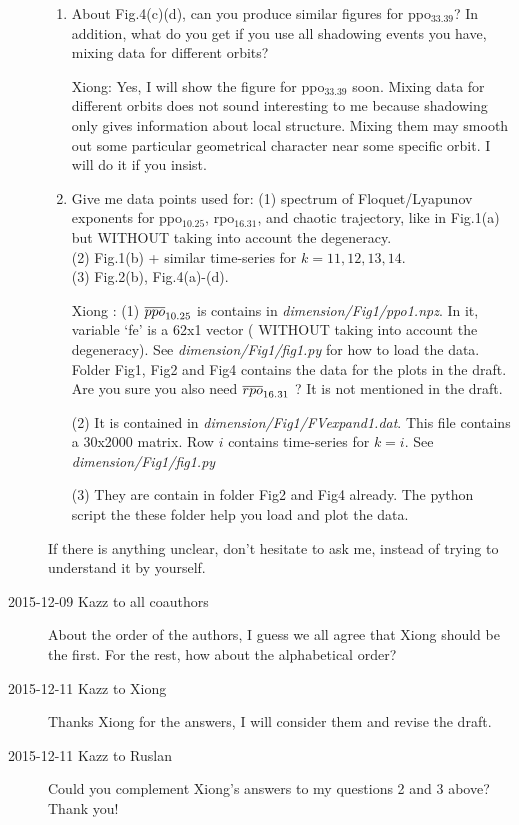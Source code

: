 \begin{description}
\begin{enumerate}
\item
About Fig.4(c)(d), can you produce similar figures for ppo$_{33.39}$? In addition, what do you get if you use all shadowing events you have, mixing data for different orbits?

Xiong: Yes, I will show the figure for ppo$_{33.39}$ soon.
Mixing data for different orbits does not sound interesting to me because shadowing only gives
information about local structure. Mixing them may smooth out some particular geometrical
character near some specific orbit. I will do it if you insist.

\item
Give me data points used for:
(1) spectrum of Floquet/Lyapunov exponents for ppo$_{10.25}$, rpo$_{16.31}$, and chaotic trajectory, like in Fig.1(a) but WITHOUT taking into account the degeneracy. \\
(2) Fig.1(b) + similar time-series for $k=11,12,13,14$. \\
(3) Fig.2(b), Fig.4(a)-(d).

Xiong :
(1) ${\overline{ppo}}_{10.25}$ is contains in \emph{dimension/Fig1/ppo1.npz}. In it, variable
`fe' is a 62x1 vector ( WITHOUT taking into account the degeneracy). See
\emph{dimension/Fig1/fig1.py} for how to load the data. Folder Fig1, Fig2 and Fig4 contains
the data for the plots in the draft.
Are you sure you also need ${\overline{rpo}}_{16.31}$ ? It is not mentioned in the draft.

(2) It is contained in \emph{dimension/Fig1/FVexpand1.dat}.
This file contains a 30x2000 matrix. Row $i$ contains time-series for $k=i$.
See \emph{dimension/Fig1/fig1.py}

(3) They are contain in folder Fig2 and Fig4 already. The python script the these folder
help you load and plot the data.

\end{enumerate}
If there is anything unclear, don't hesitate to ask me, instead of trying to understand it by yourself.

\item[2015-12-09 Kazz to all coauthors]
About the order of the authors, I guess we all agree that Xiong should be the first. For the rest, how about the alphabetical order?

\item[2015-12-11 Kazz to Xiong]
Thanks Xiong for the answers, I will consider them and revise the draft.

\item[2015-12-11 Kazz to Ruslan]
Could you complement Xiong's answers to my questions 2 and 3 above? Thank you!


\end{description}
